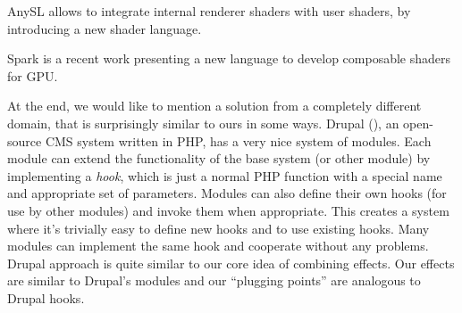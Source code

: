 \documentclass{egpubl}
\begin{document}
AnySL \cite{anysl} allows to integrate internal renderer shaders
with user shaders, by introducing a new shader language.

Spark \cite{spark} is a recent work presenting a new language to develop
composable shaders for GPU.


At the end, we would like to mention a solution from a completely
different domain, that is surprisingly similar to ours in some ways.
Drupal (),
an open-source CMS system written in PHP,
has a very nice system of modules. Each module
can extend the functionality of the base system (or other module)
by implementing a \textit{hook}, which is just a normal PHP function
with a special name and appropriate set of parameters. Modules can also define
their own hooks (for use by other modules) and invoke them when appropriate.
This creates a system where it's trivially easy to define new hooks
and to use existing hooks.
Many modules can implement the same hook and cooperate without any problems.
Drupal approach is quite similar to our
core idea of combining effects. Our effects are similar to
Drupal's modules and our ``plugging points'' are analogous to Drupal hooks.
\end{document}
